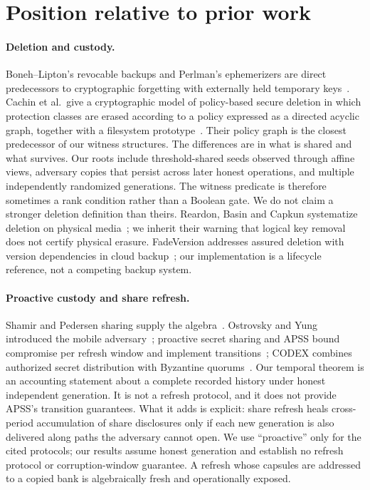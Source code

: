 \documentclass[pdflatex,sn-mathphys-num]{sn-jnl}%
\theoremstyle{plain}
\theoremstyle{definition}
\begin{document}
\section{Position relative to prior work}\label{sec:related}

\paragraph{Deletion and custody.}
Boneh--Lipton's revocable backups and Perlman's ephemerizers are direct predecessors to cryptographic forgetting with externally held temporary keys~\cite{boneh1996,perlman2007}. Cachin et al.\ give a cryptographic model of policy-based secure deletion in which protection classes are erased according to a policy expressed as a directed acyclic graph, together with a filesystem prototype~\cite{cachin2013}. Their policy graph is the closest predecessor of our witness structures. The differences are in what is shared and what survives. Our roots include threshold-shared seeds observed through affine views, adversary copies that persist across later honest operations, and multiple independently randomized generations. The witness predicate is therefore sometimes a rank condition rather than a Boolean gate. We do not claim a stronger deletion definition than theirs. Reardon, Basin and Capkun systematize deletion on physical media~\cite{reardon2013}; we inherit their warning that logical key removal does not certify physical erasure. FadeVersion addresses assured deletion with version dependencies in cloud backup~\cite{rahumed2011}; our implementation is a lifecycle reference, not a competing backup system.

\paragraph{Proactive custody and share refresh.}
Shamir and Pedersen sharing supply the algebra~\cite{shamir1979,pedersen1991}. Ostrovsky and Yung introduced the mobile adversary~\cite{ostrovsky1991}; proactive secret sharing and APSS bound compromise per refresh window and implement transitions~\cite{herzberg1995,zhou2005}; CODEX combines authorized secret distribution with Byzantine quorums~\cite{marsh2004}. Our temporal theorem is an accounting statement about a complete recorded history under honest independent generation. It is not a refresh protocol, and it does not provide APSS's transition guarantees. What it adds is explicit: share refresh heals cross-period accumulation of share disclosures only if each new generation is also delivered along paths the adversary cannot open. We use ``proactive'' only for the cited protocols; our results assume honest generation and establish no refresh protocol or corruption-window guarantee. A refresh whose capsules are addressed to a copied bank is algebraically fresh and operationally exposed.
\end{document}
